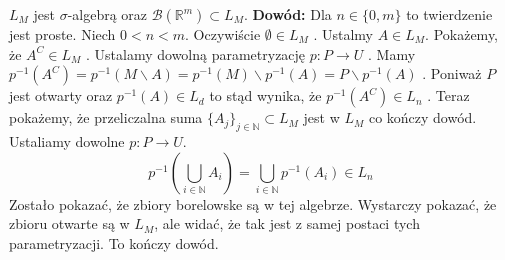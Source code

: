 \begin{tw}
    $L_M$ jest $\sigma$-algebrą oraz $\mathcal{B}(\mathbb{R}^m) \subset L_M$.
    \newline
    \textbf{Dowód:}\newline
    Dla $n \in \{0, m\}$ to twierdzenie jest proste. Niech $0 < n < m$. Oczywiście $\emptyset \in L_M$ . Ustalmy $A \in L_M$. 
    Pokażemy, że $A^C \in L_M$ . Ustalamy dowolną parametryzację $p: P \rightarrow U$ . Mamy $p^{-1}(A^C) = p^{-1}(M \backslash A) = p^{-1}(M) \backslash p^{-1}(A) = P \backslash p^{-1}(A)$ . Poniważ $P$ jest otwarty oraz $p^{-1}(A) \in L_d$ to stąd wynika, że $p^{-1}(A^C) \in L_n$ .
    Teraz pokażemy, że przeliczalna suma $\{A_j\}_{j \in \mathbb{N}} \subset L_M$ jest w $L_M$ co kończy dowód. Ustaliamy dowolne $p: P \rightarrow U$. $$ 
    p^{-1}(\bigcup_{i \in \mathbb{N}} A_i ) = \bigcup_{i \in \mathbb{N}} p^{-1}(A_i) \in L_n
    $$ Zostało pokazać, że zbiory borelowske są w tej algebrze. Wystarczy pokazać, że zbioru otwarte są w $L_M$, ale widać, że tak jest z samej postaci tych parametryzacji. To kończy dowód.  
\end{tw}